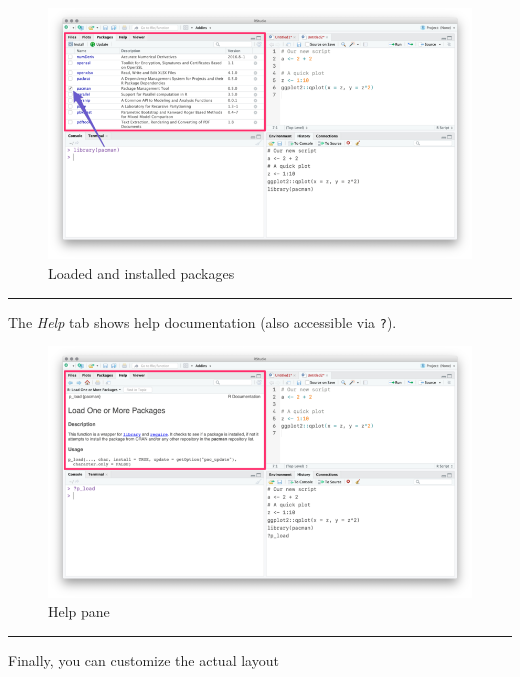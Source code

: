 \documentclass[]{book}
\begin{document}
\begin{figure}
\centering
\includegraphics{img/rstudio_packages2.png}
\caption{Loaded and installed packages}
\end{figure}

\begin{center}\rule{0.5\linewidth}{\linethickness}\end{center}

The \emph{Help} tab shows help documentation (also accessible via \texttt{?}).

\begin{figure}
\centering
\includegraphics{img/rstudio_help.png}
\caption{Help pane}
\end{figure}

\begin{center}\rule{0.5\linewidth}{\linethickness}\end{center}

Finally, you can customize the actual layout
\end{document}
